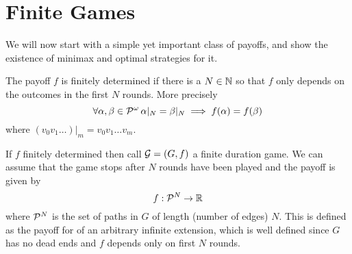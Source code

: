\section{Finite Games}
\label{sec:finitegames}

We will now start with a simple yet important class of payoffs, and show the existence of minimax and optimal strategies for it. 

The payoff $f$ is finitely determined if there is a $N \in \Nat$ so that $f$ only depends on the outcomes in the first $N$ rounds. More precisely 
\[
    \forall \alpha,\beta \in \PI\, \alpha|_N=\beta|_N \implies f(\alpha) = f(\beta) 
\]
where $( v_0 v_1 \ldots )|_m = v_0v_1 \ldots v_m$.

If $f$ finitely determined then call $\G=(G,f)$ a finite duration game. We can assume that the game stops after $N$ rounds have been played and the payoff is given by 
\[
    f : \PF[N] \to \Reals
\]
where $\PF[N]$ is the set of paths in $G$ of length (number of edges) $N$. This is defined as the payoff for of an arbitrary infinite extension, which is well defined since $G$ has no dead ends and $f$ depends only on first $N$ rounds.


